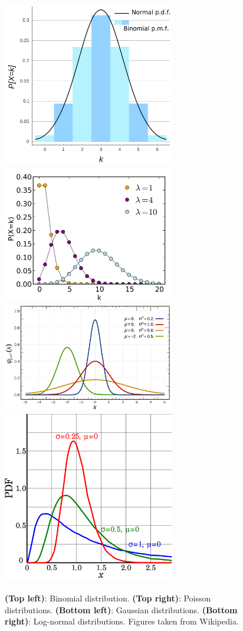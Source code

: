 \documentclass[a4paper,10pt]{article}
\begin{document}
\begin{figure}[h]
    \centering
    \includegraphics[width=7.5cm]{figures/binomial.png}
    \includegraphics[width=7.5cm]{figures/poisson.png}
    \includegraphics[width=7.5cm]{figures/gaussian.png}
    \includegraphics[width=7.5cm]{figures/log-normal.png}
    \caption{\footnotesize{\textbf{(Top left)}: Binomial distribution. \textbf{(Top right)}: Poisson distributions. \textbf{(Bottom left)}: Gaussian distributions. \textbf{(Bottom right)}: Log-normal distributions. Figures taken from Wikipedia.}}
    \label{fig:distributions}
\end{figure}
\end{document}
